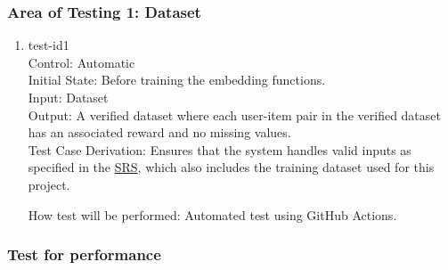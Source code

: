 \documentclass[12pt, titlepage]{article}
\begin{document}
\subsubsection{Area of Testing 1: Dataset}

\begin{enumerate}

  \item{test-id1\\}
  Control: Automatic\\
  Initial State: Before training the embedding functions.\\
  Input: Dataset\\
  Output: A verified dataset where each user-item pair in the verified dataset has an associated reward and no missing values.\\
  Test Case Derivation: Ensures that the system handles valid inputs as specified in the \href{https://github.com/V-AS/Two-tower-recommender-system/blob/main/docs/SRS/SRS.pdf}{SRS}, which also includes the training dataset used for this project.

  How test will be performed: Automated test using GitHub Actions.
					
\end{enumerate}


\subsubsection{Test for performance}
\end{document}
